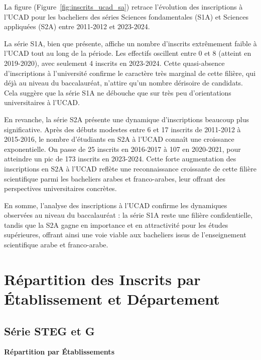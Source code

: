 La figure (Figure~\ref{fig:inscrits_ucad_sa}) retrace l'évolution des inscriptions à l'UCAD pour les bacheliers des séries Sciences fondamentales (S1A) et Sciences appliquées (S2A) entre 2011-2012 et 2023-2024.

La série S1A, bien que présente, affiche un nombre d'inscrits extrêmement faible à l'UCAD tout au long de la période. Les effectifs oscillent entre 0 et 8 (atteint en 2019-2020), avec seulement 4 inscrits en 2023-2024. 
Cette quasi-absence d'inscriptions à l'université confirme le caractère très marginal de cette filière, qui déjà au niveau du baccalauréat, n'attire qu'un nombre dérisoire de candidats. 
Cela suggère que la série S1A ne débouche que sur très peu d'orientations universitaires à l'UCAD.

En revanche, la série S2A présente une dynamique d'inscriptions beaucoup plus significative. Après des débuts modestes entre 6 et 17 inscrits de 2011-2012 à 2015-2016, le nombre d'étudiants en S2A à l'UCAD connaît une croissance exponentielle. 
On passe de 25 inscrits en 2016-2017 à 107 en 2020-2021, pour atteindre un pic de 173 inscrits en 2023-2024. Cette forte augmentation des inscriptions en S2A à l'UCAD reflète une reconnaissance croissante de cette filière scientifique parmi les bacheliers arabes et franco-arabes, leur offrant des perspectives universitaires concrètes.

En somme, l'analyse des inscriptions à l'UCAD confirme les dynamiques observées au niveau du baccalauréat : la série S1A reste une filière confidentielle, tandis que la S2A gagne en importance et en attractivité pour les études supérieures, offrant ainsi une voie viable aux bacheliers issus de l'enseignement scientifique arabe et franco-arabe.

\newpage
\section{Répartition des Inscrits par Établissement et Département}

\subsection{Série STEG et G}


\textbf{Répartition par Établissements}

